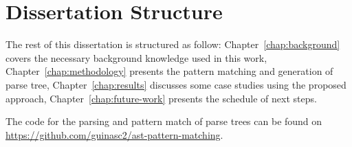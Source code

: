 

\section{Dissertation Structure}\label{sec:structure}

The rest of this dissertation is structured as follow: Chapter~\ref{chap:background}
covers the necessary background knowledge used in this work, Chapter~\ref{chap:methodology}
presents the pattern matching and generation of parse tree, Chapter~\ref{chap:results}
discusses some case studies using the proposed approach, Chapter~\ref{chap:future-work}
presents the schedule of next steps.

The code for the parsing and pattern match of parse trees can be found on
\url{https://github.com/guinasc2/ast-pattern-matching}.

\cleardoublepage
